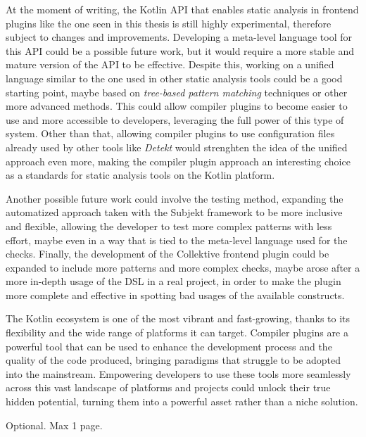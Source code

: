 \documentclass[12pt,a4paper,openright,twoside]{book}
\begin{document}
At the moment of writing, the Kotlin API that enables static analysis in
frontend plugins like the one seen in this thesis is still highly experimental,
therefore subject to changes and improvements. Developing a meta-level language
tool for this API could be a possible future work, but it would require a more
stable and mature version of the API to be effective.
%
Despite this, working on a unified language similar to the one used in other
static analysis tools could be a good starting point, maybe based on
\emph{tree-based pattern matching} techniques or other more advanced methods.
This could allow compiler plugins to become easier to use and more accessible
to developers, leveraging the full power of this type of system. 
%
Other than that, allowing compiler plugins to use configuration files already
used by other tools like \emph{Detekt} would strenghten the idea of the unified
approach even more, making the compiler plugin approach an interesting choice 
as a standards for static analysis tools on the Kotlin platform.

Another possible future work could involve the testing method, expanding the
automatized approach taken with the Subjekt framework to be more inclusive and
flexible, allowing the developer to test more complex patterns with less effort,
maybe even in a way that is tied to the meta-level language used for the checks.
%
Finally, the development of the Collektive frontend plugin could be expanded to
include more patterns and more complex checks, maybe arose after a more in-depth
usage of the \ac{DSL} in a real project, in order to make the plugin more
complete and effective in spotting bad usages of the available constructs.

The Kotlin ecosystem is one of the most vibrant and fast-growing, thanks to its
flexibility and the wide range of platforms it can target. Compiler plugins are
a powerful tool that can be used to enhance the development process and the
quality of the code produced, bringing paradigms that struggle to be adopted
into the mainstream. 
%
Empowering developers to use these tools more seamlessly across this vast
landscape of platforms and projects could unlock their true hidden potential,
turning them into a powerful asset rather than a niche solution.




\backmatter

\nocite{*} %




\begin{acknowledgements} %
Optional. Max 1 page.
\end{acknowledgements}
\end{document}
